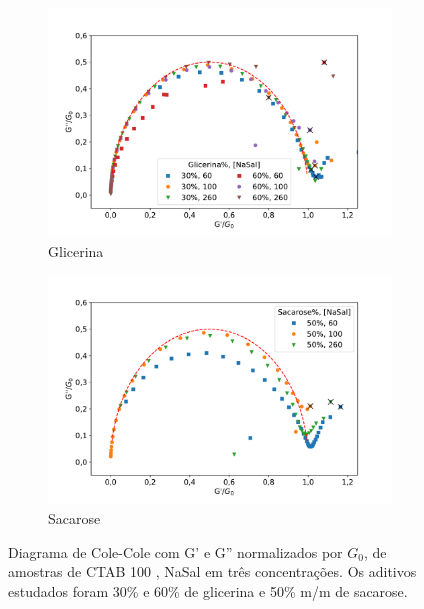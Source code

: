 		\begin{figure}[h]
			\begin{subfigure}[t]{0.5\textwidth}
				\centering
				\includegraphics[width=\textwidth]{imagens/reologia/colecole_glicerina}
				\caption{Glicerina}
				\label{fig:colecole_glicerina}
			\end{subfigure} %
			\begin{subfigure}[t]{0.5\textwidth}
				\centering
				\includegraphics[width=\textwidth]{imagens/reologia/colecole_sacarose}
				\caption{Sacarose}
				\label{fig:colecole_sacarose}
			\end{subfigure} %
			\caption{Diagrama de Cole-Cole com G' e G'' normalizados por \(G_0\), de amostras de CTAB 100 \mM{}, NaSal em três concentrações. Os aditivos estudados foram 30\% e 60\% de glicerina e 50\% m/m de sacarose.}
			\label{fig:colecole_glicerina_sacarose}
		\end{figure}
		
